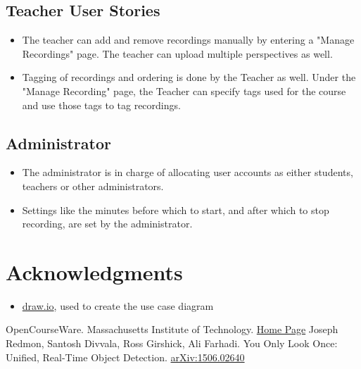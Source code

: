 \documentclass[12pt, conference]{IEEEtran}
\begin{document}
\subsection{Teacher User Stories}
\begin{itemize}
    \item{The teacher can add and remove recordings manually by entering a "Manage Recordings" page. The teacher can upload multiple perspectives as well.}
    \item{Tagging of recordings and ordering is done by the Teacher as well. Under the "Manage Recording" page, the Teacher can specify tags used for the course and use those tags to tag recordings.}
\end{itemize}
\subsection{Administrator}
\begin{itemize}
    \item{The administrator is in charge of allocating user accounts as either students, teachers or other administrators.}
    \item{Settings like the minutes before which to start, and after which to stop recording, are set by the administrator.}
\end{itemize}

\section*{Acknowledgments}
\begin{itemize}
    \item{\href{draw.io}{draw.io}, used to create the use case diagram}
\end{itemize}

\begin{thebibliography}{00}

 OpenCourseWare. Massachusetts Institute of Technology. \href{https://ocw.mit.edu/}{Home Page}
 Joseph Redmon, Santosh Divvala, Ross Girshick, Ali Farhadi. You Only Look Once: Unified, Real-Time Object Detection. \href{https://arxiv.org/abs/1506.02640v5}{arXiv:1506.02640}
\end{thebibliography}


\onecolumn

\end{document}
